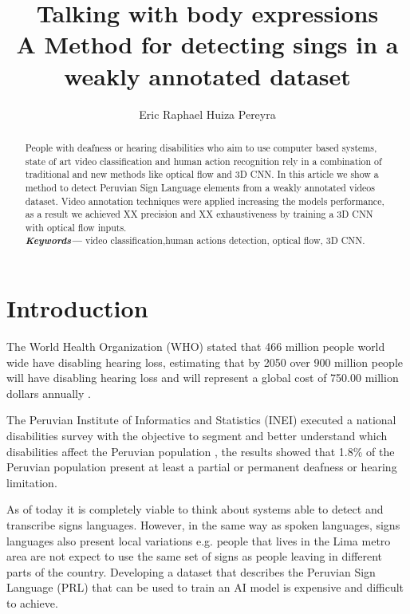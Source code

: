\documentclass[twocolumn]{article}
\providecommand{\keywords}[1]
{
  \small	
  \textbf{\textit{Keywords---}} #1
}
\begin{document}
\author[1]{Eric Raphael Huiza Pereyra}

\title{%
	\vspace{-2.0cm}
	\textbf{Talking with body expressions} \\	
	\Large \textbf{A Method for detecting sings in a weakly annotated dataset}
}

\maketitle
    
\begin{abstract}
People with deafness or hearing disabilities who aim to use computer based systems, state of art video classification and human action recognition rely in a combination of traditional and new methods like optical flow and 3D CNN. In this article we show a method to detect Peruvian Sign Language elements from a weakly annotated videos dataset. Video annotation techniques were applied increasing the models performance, as a result we achieved XX precision and XX exhaustiveness by training a 3D CNN with optical flow inputs.   \\
\keywords{video classification,human actions detection, optical flow, 3D CNN.}
\end{abstract}

\section{Introduction}\label{intro}

The World Health Organization (WHO) stated that 466 million people world wide have disabling hearing loss, estimating that by 2050 over 900 million people will have disabling hearing loss and will represent a global cost of 750.00 million dollars annually \cite{deafness_and_hearing_loss_2019}. 

The Peruvian Institute of Informatics and Statistics (INEI) executed a national disabilities survey with the objective to segment and better understand which disabilities affect the Peruvian population \cite{disabilities_survey_2012}, the results showed that 1.8\% of the Peruvian population present at least a partial or permanent deafness or hearing limitation. 

As of today it is completely viable to think about systems able to detect and transcribe signs languages. However, in the same way as spoken languages, signs languages also present local variations e.g. people that lives in the Lima metro area are not expect to use the same set of signs as people leaving in different parts of the country. Developing a dataset that describes the Peruvian Sign Language (PRL) \cite{lsp_2015} that can be used to train an AI model is expensive and difficult to achieve. 
\end{document}
